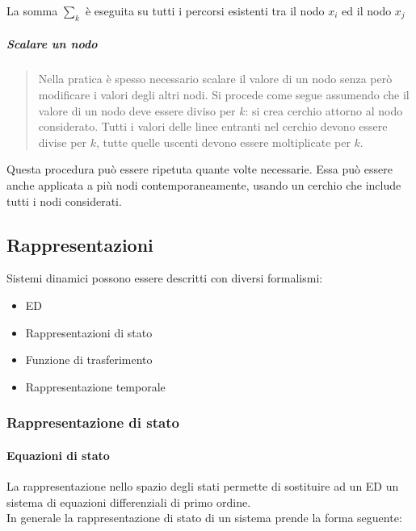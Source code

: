 \documentclass[11pt]{article}
\providecommand{\tightlist}{%
      \setlength{\itemsep}{0pt}\setlength{\parskip}{0pt}}
\begin{document}
La somma \(\sum_k\) è eseguita su tutti i percorsi esistenti tra il nodo
\(x_i\) ed il nodo \(x_j\)

    \hypertarget{scalare-un-nodo}{%
\subparagraph{Scalare un nodo}\label{scalare-un-nodo}}

\begin{quote}
Nella pratica è spesso necessario scalare il valore di un nodo senza
però modificare i valori degli altri nodi. Si procede come segue
assumendo che il valore di un nodo deve essere diviso per \(k\): si crea
cerchio attorno al nodo considerato. Tutti i valori delle linee entranti
nel cerchio devono essere divise per \(k\), tutte quelle uscenti devono
essere moltiplicate per \(k\).
\end{quote}

    Questa procedura può essere ripetuta quante volte necessarie. Essa può
essere anche applicata a più nodi contemporaneamente, usando un cerchio
che include tutti i nodi considerati.

    \hypertarget{rappresentazioni}{%
\subsection{Rappresentazioni}\label{rappresentazioni}}

Sistemi dinamici possono essere descritti con diversi formalismi:

\begin{itemize}
\tightlist
\item
  ED
\item
  Rappresentazioni di stato
\item
  Funzione di trasferimento
\item
  Rappresentazione temporale
\end{itemize}

\hypertarget{rappresentazione-di-stato}{%
\subsubsection{Rappresentazione di
stato}\label{rappresentazione-di-stato}}

\hypertarget{equazioni-di-stato}{%
\paragraph{Equazioni di stato}\label{equazioni-di-stato}}

La rappresentazione nello spazio degli stati permette di sostituire ad
un ED un sistema di equazioni differenziali di primo ordine.\\
In generale la rappresentazione di stato di un sistema prende la forma
seguente:
\end{document}
